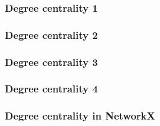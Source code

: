 \begin{frame}
\frametitle{Degree centrality 1}

\end{frame}


\begin{frame}
\frametitle{Degree centrality 2}

\end{frame}


\begin{frame}
\frametitle{Degree centrality 3}

\end{frame}


\begin{frame}
\frametitle{Degree centrality 4}

\end{frame}


\begin{frame}
\tiny
\frametitle{Degree centrality in NetworkX}

\end{frame}
